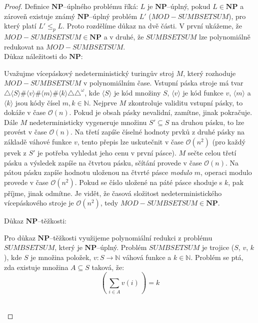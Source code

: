\documentclass[a4paper, 11pt, fleqn]{scrartcl}
\begin{document}
  \begin{proof}
    Definice $\mathbf{NP}$--úplného problému říká: $L$ je $\mathbf{NP}$--úplný, pokud $L \in \mathbf{NP}$ a zároveň existuje známý $\mathbf{NP}$--úplný problém $L'$ ($\mathit{MOD-SUMBSETSUM}$), pro který platí $L' \leq_p L$. Proto rozdělíme důkaz na dvě části. V první ukážeme, že $\mathit{MOD-SUMBSETSUM} \in \mathbf{NP}$ a v druhé, že $\mathit{SUMBSETSUM}$ lze polynomiálně redukovat na $\mathit{MOD-SUMBSETSUM}$. \\

    Důkaz náležitosti do $\mathbf{NP}$:

      \begin{adjustwidth}{1em}{0em}
        Uvažujme vícepáskový nedeterministický turingův stroj $M$, který rozhoduje $\mathit{MOD-SUMBSETSUM}$ v polynomiálním čase. Vstupní páska stroje má tvar $\triangle\langle S \rangle \# \langle v \rangle \# \langle m \rangle \# \langle k \rangle \triangle \triangle^\omega$, kde $\langle S \rangle$ je kód množiny $S$, $\langle v \rangle$ je kód funkce $v$, $\langle m \rangle$ a $\langle k \rangle$ jsou kódy čísel $m, k \in \mathbb{N}$. Nejprve $M$ zkontroluje validitu vstupní pásky, to dokáže v čase $\mathcal{O}(n)$. Pokud je obsah pásky nevalidní, zamítne, jinak pokračuje. Dále $M$ nedeterministicky vygeneruje množinu $S' \subseteq S$ na druhou pásku, to lze provést v čase $\mathcal{O}(n)$. Na třetí zapíše číselné hodnoty prvků z druhé pásky na základě váhové funkce $v$, tento přepis lze uskutečnit v čase $\mathcal{O}(n^2)$ (pro každý prvek z $S'$ je potřeba vyhledat jeho cenu v první pásce). $M$ sečte celou třetí pásku a výsledek zapíše na čtvrtou pásku, sčítání provede v čase $\mathcal{O}(n)$. Na pátou pásku zapíše hodnotu uloženou na čtvrté pásce \textit{modulo} $m$, operaci modulo provede v čase $\mathcal{O}(n^2)$. Pokud se číslo uložené na páté pásce shoduje s $k$, pak příjme, jinak odmítne. Je vidět, že časová složitost nedeterministického vícepáskového stroje je $\mathcal{O}(n^2)$, tedy $\mathit{MOD-SUMBSETSUM} \in \mathbf{NP}$.
      \end{adjustwidth}

    \vspace{0.3cm}
    Důkaz $\mathbf{NP}$--těžkosti:

      \begin{adjustwidth}{1em}{0em}
        Pro důkaz $\mathbf{NP}$--těžkosti využijeme polynomiální redukci z problému $\mathit{SUMBSETSUM}$, který je $\mathbf{NP}$--úplný. Problém $\mathit{SUMBSETSUM}$ je trojice ($S$, $v$, $k$), kde $S$ je množina položek, $v : S \rightarrow \mathbb{N}$ váhová funkce a $k \in \mathbb{N}$. Problém se ptá, zda existuje množina $A \subseteq S$ taková, že:
        $$ \left(\, \sum_{i \in A}v(i)\,\right) = k $$\\


\end{adjustwidth}
\end{proof}
\end{document}
